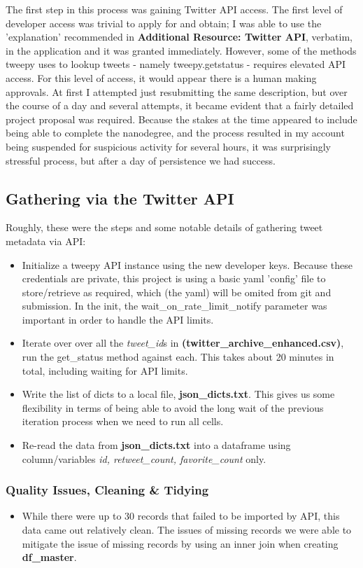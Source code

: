 \documentclass[10pt,a4paper]{report}
\begin{document}
The first step in this process was gaining Twitter API access. The first level of developer access was trivial to apply for and obtain; I was able to use the 'explanation' recommended 
in \textbf{Additional Resource: Twitter API}, verbatim, in the application and it was granted immediately. However, some of the methods tweepy uses to lookup tweets
 - namely tweepy.getstatus - requires elevated API access. For this level of access, it would appear there is a human making approvals. At first I attempted just resubmitting the same description,
but over the course of a day and several attempts, it became evident that a fairly detailed project proposal was required. Because the stakes at the time appeared to include being able to complete
the nanodegree, and the process resulted in my account being suspended for suspicious activity for several hours, it was surprisingly stressful process, but after a day of persistence we had success.

	\subsection{Gathering via the Twitter API}
	Roughly, these were the steps and some notable details of gathering tweet metadata via API:
		\begin{itemize}
			\item Initialize a tweepy API instance using the new developer keys. 
				\subitem Because these credentials are private, this project is using a basic yaml 'config' file to store/retrieve as required,
				which (the yaml) will be omited from git and submission.
				In the init, the wait\_on\_rate\_limit\_notify parameter was important in order to handle the API limits.
			\item Iterate over over all the \textit{tweet\_id}s in \textbf{(twitter\_archive\_enhanced.csv)}, run the get\_status method against each. This takes about 20 minutes in total, including
			waiting for API limits. 
			\item Write the list of dicts to a local file, \textbf{json\_dicts.txt}. This gives us some flexibility in terms of being able to avoid the long wait of the previous iteration process 
			when we need to run all cells.
			\item Re-read the data from  \textbf{json\_dicts.txt} into a dataframe using column/variables \textit{id, retweet\_count, favorite\_count} only.
		\end{itemize}
	\subsubsection{Quality Issues, Cleaning \& Tidying}
		\begin{itemize}
			\item While there were up to 30 records that failed to be imported by API, this data came out relatively clean. The issues of missing records we were able to mitigate the issue of missing records by using an 
			inner join when creating \textbf{df\_master}.

		\end{itemize} 
\end{document}
